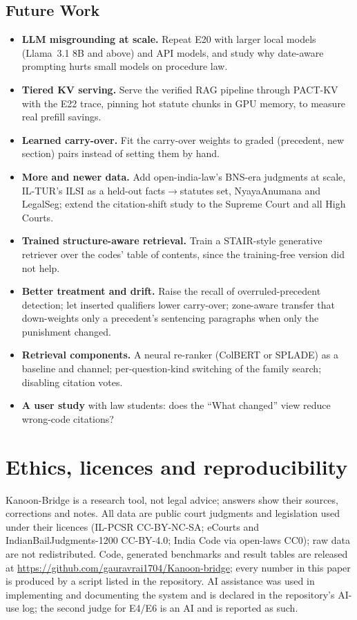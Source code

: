 \documentclass[sigconf,nonacm]{acmart}
\begin{document}
\subsection{Future Work}\label{sec:future}
\begin{itemize}
\item \textbf{LLM misgrounding at scale.} Repeat E20 with larger local models (Llama~3.1 8B and above)
and API models, and study why date-aware prompting hurts small models on procedure law.
\item \textbf{Tiered KV serving.} Serve the verified RAG pipeline through PACT-KV \cite{pactkv} with
the E22 trace, pinning hot statute chunks in GPU memory, to measure real prefill savings.
\item \textbf{Learned carry-over.} Fit the carry-over weights to graded (precedent, new section)
pairs instead of setting them by hand.
\item \textbf{More and newer data.} Add open-india-law's BNS-era judgments at scale, IL-TUR's ILSI as
a held-out facts$\to$statutes set, NyayaAnumana and LegalSeg; extend the citation-shift study to the
Supreme Court and all High Courts.
\item \textbf{Trained structure-aware retrieval.} Train a STAIR-style generative retriever over the
codes' table of contents, since the training-free version did not help.
\item \textbf{Better treatment and drift.} Raise the recall of overruled-precedent detection; let
inserted qualifiers lower carry-over; zone-aware transfer that down-weights only a precedent's
sentencing paragraphs when only the punishment changed.
\item \textbf{Retrieval components.} A neural re-ranker (ColBERT or SPLADE) as a baseline and
channel; per-question-kind switching of the family search; disabling citation votes.
\item \textbf{A user study} with law students: does the ``What changed'' view reduce wrong-code
citations?
\end{itemize}

\section*{Ethics, licences and reproducibility}
Kanoon-Bridge is a research tool, not legal advice; answers show their sources, corrections and
notes. All data are public court judgments and legislation used under their licences (IL-PCSR
CC-BY-NC-SA; eCourts and IndianBailJudgments-1200 CC-BY-4.0; India Code via open-laws CC0); raw
data are not redistributed. Code, generated benchmarks and result tables are
released at \url{https://github.com/gauravrai1704/Kanoon-bridge}; every number in this paper is produced by a script listed in the
repository. AI assistance was used in implementing and documenting the system and is declared in
the repository's AI-use log; the second judge for E4/E6 is an AI and is reported as such.
\end{document}
